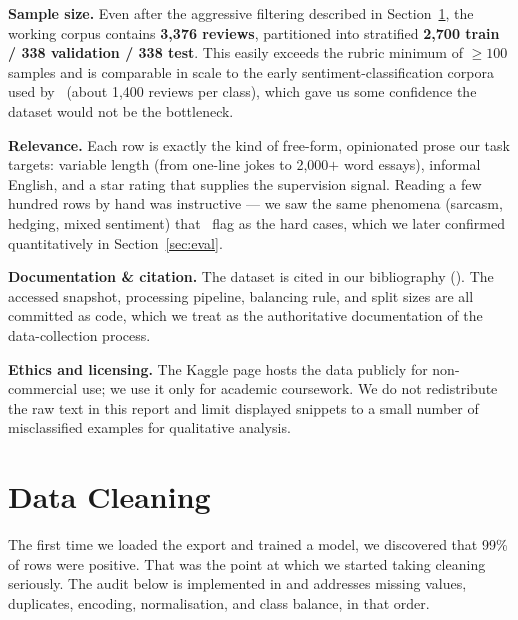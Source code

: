 \documentclass[11pt]{article}
\begin{document}
\textbf{Sample size.} Even after the aggressive filtering described in Section~\ref{sec:cleaning}, the working corpus contains \textbf{3{,}376 reviews}, partitioned into stratified \textbf{2{,}700 train / 338 validation / 338 test}. This easily exceeds the rubric minimum of $\geq 100$ samples and is comparable in scale to the early sentiment-classification corpora used by~\citet{pang_lee_vaithyanathan_2002} (about 1{,}400 reviews per class), which gave us some confidence the dataset would not be the bottleneck.

\textbf{Relevance.} Each row is exactly the kind of free-form, opinionated prose our task targets: variable length (from one-line jokes to 2{,}000$+$ word essays), informal English, and a star rating that supplies the supervision signal. Reading a few hundred rows by hand was instructive --- we saw the same phenomena (sarcasm, hedging, mixed sentiment) that~\citet{pang_lee_2008} flag as the hard cases, which we later confirmed quantitatively in Section~\ref{sec:eval}.

\textbf{Documentation \& citation.} The dataset is cited in our bibliography (). The accessed snapshot, processing pipeline, balancing rule, and split sizes are all committed as code, which we treat as the authoritative documentation of the data-collection process.

\textbf{Ethics and licensing.} The Kaggle page hosts the data publicly for non-commercial use; we use it only for academic coursework. We do not redistribute the raw text in this report and limit displayed snippets to a small number of misclassified examples for qualitative analysis.

\section{Data Cleaning}
\label{sec:cleaning}

The first time we loaded the export and trained a model, we discovered that 99\% of rows were positive. That was the point at which we started taking cleaning seriously. The audit below is implemented in  and addresses missing values, duplicates, encoding, normalisation, and class balance, in that order.
\end{document}
